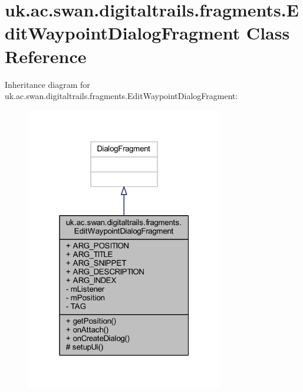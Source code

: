 \hypertarget{classuk_1_1ac_1_1swan_1_1digitaltrails_1_1fragments_1_1_edit_waypoint_dialog_fragment}{\section{uk.\+ac.\+swan.\+digitaltrails.\+fragments.\+Edit\+Waypoint\+Dialog\+Fragment Class Reference}
\label{classuk_1_1ac_1_1swan_1_1digitaltrails_1_1fragments_1_1_edit_waypoint_dialog_fragment}
}


Inheritance diagram for uk.\+ac.\+swan.\+digitaltrails.\+fragments.\+Edit\+Waypoint\+Dialog\+Fragment\+:
\nopagebreak
\begin{figure}[H]
\begin{center}
\leavevmode
\includegraphics[width=244pt]{classuk_1_1ac_1_1swan_1_1digitaltrails_1_1fragments_1_1_edit_waypoint_dialog_fragment__inherit__graph}
\end{center}
\end{figure}


